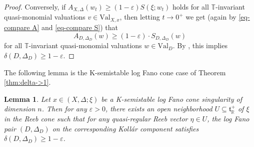 \documentclass[12pt]{amsart}
\newtheorem{lem}[prop]{Lemma}
\theoremstyle{definition}
\newcommand{\bR}{\mathbb{R}}
\newcommand{\bT}{\mathbb{T}}
\newcommand{\ft}{\mathfrak{t}}
\newcommand{\Val}{\mathrm{Val}}
\numberwithin{equation}{section}
\begin{document}
\begin{proof}
Conversely, if $A_{X,\Delta}(w_t) \ge (1-\varepsilon)S(\xi;w_t)$ holds for all $\bT$-invariant quasi-monomial valuations $v\in \Val_{X,x}$, then letting $t\to 0^+$ we get (again by \eqref{eq-compare A} and \eqref{eq-compare S}) that
\[
A_{D,\Delta_D}(w)\ge (1-\varepsilon)\cdot S_{D,\Delta_D}(w)
\]
for all $\bT$-invariant quasi-monomial valuations $w\in \Val_D$. By \cite[Theorem 1.2]{Z-equivariant-K}, this implies $\delta(D,\Delta_D)\ge 1-\varepsilon$.
\end{proof}

The following lemma is the K-semistable log Fano cone case of Theorem \ref{thm:delta->1}.

\begin{lem} \label{lem:delta->1 Fano cone}
Let $x\in (X,\Delta;\xi)$ be a K-semistable log Fano cone singularity of dimension $n$. Then for any $\varepsilon>0$, there exists an open neighborhood $U\subseteq \ft_\bR^+$ of $\xi$ in the Reeb cone such that for any quasi-regular Reeb vector $\eta\in U$, the log Fano pair $(D,\Delta_D)$ on the corresponding Koll\'ar component satisfies $\delta(D,\Delta_D)\ge 1-\varepsilon$.
\end{lem}
\end{document}
